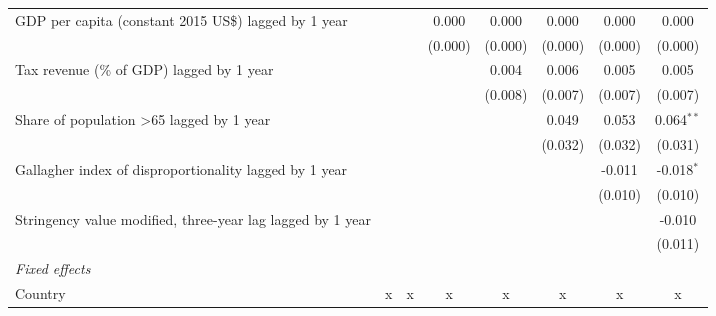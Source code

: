 \begin{tabular}{lccccccc}
   GDP per capita (constant 2015 US\$) lagged by 1 year                                &               &               & 0.000         & 0.000         & 0.000        & 0.000        & 0.000\\   
                                                                                       &               &               & (0.000)       & (0.000)       & (0.000)      & (0.000)      & (0.000)\\   
   Tax revenue (\% of GDP) lagged by 1 year                                            &               &               &               & 0.004         & 0.006        & 0.005        & 0.005\\   
                                                                                       &               &               &               & (0.008)       & (0.007)      & (0.007)      & (0.007)\\   
   Share of population >65 lagged by 1 year                                            &               &               &               &               & 0.049        & 0.053        & 0.064$^{**}$\\   
                                                                                       &               &               &               &               & (0.032)      & (0.032)      & (0.031)\\   
   Gallagher index of disproportionality lagged by 1 year                              &               &               &               &               &              & -0.011       & -0.018$^{*}$\\   
                                                                                       &               &               &               &               &              & (0.010)      & (0.010)\\   
   Stringency value modified, three-year lag lagged by 1 year                          &               &               &               &               &              &              & -0.010\\   
                                                                                       &               &               &               &               &              &              & (0.011)\\   
   \emph{Fixed effects}\\
   Country                                                                             & x             & x             & x             & x             & x            & x            & x\\  

\end{tabular}

